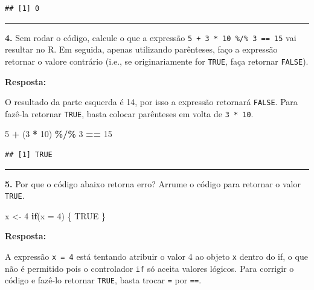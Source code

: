 \documentclass[
]{book}
\newenvironment{Shaded}{\begin{snugshade}}{\end{snugshade}}
\newcommand{\ControlFlowTok}[1]{\textcolor[rgb]{0.13,0.29,0.53}{\textbf{#1}}}
\newcommand{\DataTypeTok}[1]{\textcolor[rgb]{0.13,0.29,0.53}{#1}}
\newcommand{\DecValTok}[1]{\textcolor[rgb]{0.00,0.00,0.81}{#1}}
\newcommand{\NormalTok}[1]{#1}
\newcommand{\OperatorTok}[1]{\textcolor[rgb]{0.81,0.36,0.00}{\textbf{#1}}}
\newcommand{\OtherTok}[1]{\textcolor[rgb]{0.56,0.35,0.01}{#1}}
\newcommand{\StringTok}[1]{\textcolor[rgb]{0.31,0.60,0.02}{#1}}
\begin{document}
\begin{verbatim}
## [1] 0
\end{verbatim}

\begin{center}\rule{0.5\linewidth}{0.5pt}\end{center}

\textbf{4.} Sem rodar o código, calcule o que a expressão \texttt{5\ +\ 3\ *\ 10\ \%/\%\ 3\ ==\ 15} vai resultar no R. Em seguida, apenas utilizando parênteses, faço a expressão retornar o valore contrário (i.e., se originariamente for \texttt{TRUE}, faça retornar \texttt{FALSE}).

\textbf{Resposta:}

O resultado da parte esquerda é 14, por isso a expressão retornará \texttt{FALSE}. Para fazê-la retornar \texttt{TRUE}, basta colocar parênteses em volta de \texttt{3\ *\ 10}.

\begin{Shaded}
\begin{Highlighting}[]
\DecValTok{5} \OperatorTok{+}\StringTok{ }\NormalTok{(}\DecValTok{3} \OperatorTok{*}\StringTok{ }\DecValTok{10}\NormalTok{) }\OperatorTok{\%/\%}\StringTok{ }\DecValTok{3} \OperatorTok{==}\StringTok{ }\DecValTok{15}
\end{Highlighting}
\end{Shaded}

\begin{verbatim}
## [1] TRUE
\end{verbatim}

\begin{center}\rule{0.5\linewidth}{0.5pt}\end{center}

\textbf{5.} Por que o código abaixo retorna erro? Arrume o código para retornar o valor \texttt{TRUE}.

\begin{Shaded}
\begin{Highlighting}[]
\NormalTok{x <{-}}\StringTok{ }\DecValTok{4}
\ControlFlowTok{if}\NormalTok{(}\DataTypeTok{x =} \DecValTok{4}\NormalTok{) \{}
  \OtherTok{TRUE}
\NormalTok{\}}
\end{Highlighting}
\end{Shaded}

\textbf{Resposta:}

A expressão \texttt{x\ =\ 4} está tentando atribuir o valor 4 ao objeto \texttt{x} dentro do if, o que não é permitido pois o controlador \texttt{if} só aceita valores lógicos. Para corrigir o código e fazê-lo retornar \texttt{TRUE}, basta trocar \texttt{=} por \texttt{==}.
\end{document}
